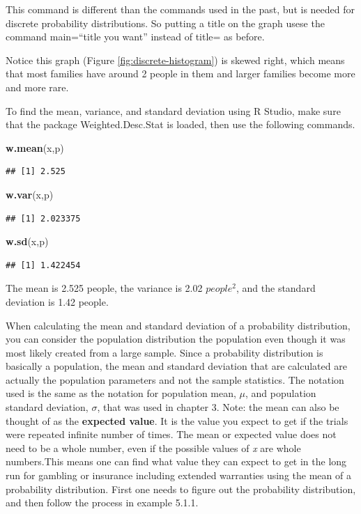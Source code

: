 \documentclass[]{book}
\newenvironment{Shaded}{\begin{snugshade}}{\end{snugshade}}
\newcommand{\KeywordTok}[1]{\textcolor[rgb]{0.13,0.29,0.53}{\textbf{#1}}}
\newcommand{\NormalTok}[1]{#1}
\begin{document}
This command is different than the commands used in the past, but is needed for discrete probability distributions. So putting a title on the graph usese the command main=``title you want'' instead of title= as before.

Notice this graph (Figure \ref{fig:discrete-histogram}) is skewed right, which means that most families have around 2 people in them and larger families become more and more rare.

To find the mean, variance, and standard deviation using R Studio, make sure that the package Weighted.Desc.Stat is loaded, then use the following commands.

\begin{Shaded}
\begin{Highlighting}[]
\KeywordTok{w.mean}\NormalTok{(x,p)}
\end{Highlighting}
\end{Shaded}

\begin{verbatim}
## [1] 2.525
\end{verbatim}

\begin{Shaded}
\begin{Highlighting}[]
\KeywordTok{w.var}\NormalTok{(x,p)}
\end{Highlighting}
\end{Shaded}

\begin{verbatim}
## [1] 2.023375
\end{verbatim}

\begin{Shaded}
\begin{Highlighting}[]
\KeywordTok{w.sd}\NormalTok{(x,p)}
\end{Highlighting}
\end{Shaded}

\begin{verbatim}
## [1] 1.422454
\end{verbatim}

The mean is 2.525 people, the variance is 2.02 \(people^2\), and the standard deviation is 1.42 people.

When calculating the mean and standard deviation of a probability distribution, you can consider the population distribution the population even though it was most likely created from a large sample. Since a probability distribution is basically a population, the mean and standard deviation that are calculated are actually the population parameters and not the sample statistics. The notation used is the same as the notation for population mean, \(\mu\), and population standard deviation, \(\sigma\), that was used in chapter 3. Note: the mean can also be thought of as the \textbf{expected value}. It is the value you expect to get if the trials were repeated infinite number of times. The mean or expected value does not need to be a whole number, even if the possible values of \emph{x} are whole numbers.This means one can find what value they can expect to get in the long run for gambling or insurance including extended warranties using the mean of a probability distribution. First one needs to figure out the probability distribution, and then follow the process in example 5.1.1.
\end{document}

